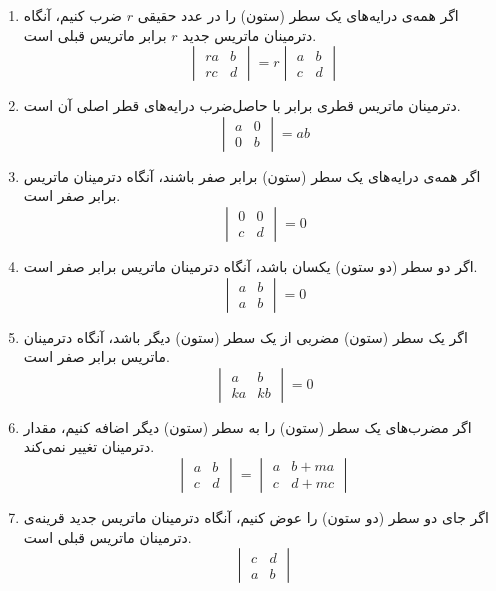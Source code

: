 \begin{enumerate}
	\item 
	اگر همه‌ی درایه‌های یک سطر (ستون) را در عدد حقیقی $r$ ضرب کنیم، آنگاه دترمینان ماتریس جدید $r$ برابر ماتریس قبلی است.
	\[
	\begin{vmatrix}
		ra & b \\
		rc & d
	\end{vmatrix}
	= r
	\begin{vmatrix}
		a & b \\
		c & d
	\end{vmatrix}
	\]
	\item 
	دترمینان ماتریس قطری برابر با حاصل‌ضرب درایه‌های قطر اصلی آن است.
	\[
	\begin{vmatrix}
		a & 0 \\
		0 & b
	\end{vmatrix} = ab
	\]
	\item 
	اگر همه‌ی درایه‌های یک سطر (ستون) برابر صفر باشند، آنگاه دترمینان ماتریس برابر صفر است.
	\[
	\begin{vmatrix}
		0 & 0 \\
		c & d
	\end{vmatrix} = 0
	\]
	\item 
	اگر دو سطر (دو ستون) یکسان باشد، آنگاه دترمینان ماتریس برابر صفر است.
	\[
	\begin{vmatrix}
		a & b \\
		a & b
	\end{vmatrix} = 0
	\]
	\item 
	اگر یک سطر (ستون) مضربی از یک سطر (ستون) دیگر باشد، آنگاه دترمینان ماتریس برابر صفر است.
	\[
	\begin{vmatrix}
		a & b \\
		ka & kb
	\end{vmatrix} = 0
	\]
	\item 
	اگر مضرب‌های یک سطر (ستون) را به سطر (ستون) دیگر اضافه کنیم، مقدار دترمینان تغییر نمی‌کند.
	\[
	\begin{vmatrix}
		a & b \\
		c & d
	\end{vmatrix}
	=
	\begin{vmatrix}
		a & b+ma \\
		c & d+mc
	\end{vmatrix}
	\]
	\item 
	اگر جای دو سطر (دو ستون) را عوض کنیم، آنگاه دترمینان ماتریس جدید قرینه‌ی دترمینان ماتریس قبلی است.
	\[
	\begin{vmatrix}
		c & d \\
		a & b
	\end{vmatrix}
\]
\end{enumerate}
